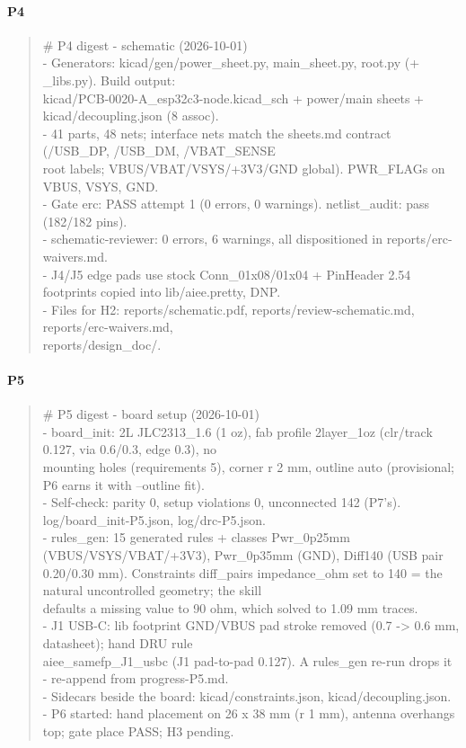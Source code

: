 \documentclass[11pt]{article}
\begin{document}
\paragraph*{P4}
\begin{quote}\small\ttfamily\raggedright
\# P4 digest - schematic (2026-10-01)\\
- Generators: kicad/gen/power\_sheet.py, main\_sheet.py, root.py (+ \_libs.py). Build output:\\
  kicad/PCB-0020-A\_esp32c3-node.kicad\_sch + power/main sheets + kicad/decoupling.json (8 assoc).\\
- 41 parts, 48 nets; interface nets match the sheets.md contract (/USB\_DP, /USB\_DM, /VBAT\_SENSE\\
  root labels; VBUS/VBAT/VSYS/+3V3/GND global). PWR\_FLAGs on VBUS, VSYS, GND.\\
- Gate erc: PASS attempt 1 (0 errors, 0 warnings). netlist\_audit: pass (182/182 pins).\\
- schematic-reviewer: 0 errors, 6 warnings, all dispositioned in reports/erc-waivers.md.\\
- J4/J5 edge pads use stock Conn\_01x08/01x04 + PinHeader 2.54 footprints copied into lib/aiee.pretty, DNP.\\
- Files for H2: reports/schematic.pdf, reports/review-schematic.md, reports/erc-waivers.md,\\
  reports/design\_doc/.
\end{quote}
\paragraph*{P5}
\begin{quote}\small\ttfamily\raggedright
\# P5 digest - board setup (2026-10-01)\\
- board\_init: 2L JLC2313\_1.6 (1 oz), fab profile 2layer\_1oz (clr/track 0.127, via 0.6/0.3, edge 0.3), no\\
  mounting holes (requirements 5), corner r 2 mm, outline auto (provisional; P6 earns it with --outline fit).\\
- Self-check: parity 0, setup violations 0, unconnected 142 (P7's). log/board\_init-P5.json, log/drc-P5.json.\\
- rules\_gen: 15 generated rules + classes Pwr\_0p25mm (VBUS/VSYS/VBAT/+3V3), Pwr\_0p35mm (GND), Diff140 (USB pair\\
  0.20/0.30 mm). Constraints diff\_pairs impedance\_ohm set to 140 = the natural uncontrolled geometry; the skill\\
  defaults a missing value to 90 ohm, which solved to 1.09 mm traces.\\
- J1 USB-C: lib footprint GND/VBUS pad stroke removed (0.7 -\textgreater{} 0.6 mm, datasheet); hand DRU rule\\
  aiee\_samefp\_J1\_usbc (J1 pad-to-pad 0.127). A rules\_gen re-run drops it - re-append from progress-P5.md.\\
- Sidecars beside the board: kicad/constraints.json, kicad/decoupling.json.\\
- P6 started: hand placement on 26 x 38 mm (r 1 mm), antenna overhangs top; gate place PASS; H3 pending.
\end{quote}
\end{document}
